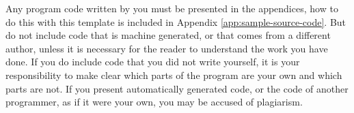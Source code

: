\documentclass[a4paper, notitlepage, 11pt]{article}
\begin{document}
Any program code written by you must be presented in the appendices, how to do this with this template is included in Appendix \ref{app:sample-source-code}. But do not include code that is machine generated, or that comes from a different author, unless it is necessary for the reader to understand the work you have done. If you do include code that you did not write yourself, it is your responsibility to make clear which parts of the program are your own and which  parts  are  not.  If  you  present  automatically  generated  code,  or  the  code  of  another programmer, as if it were your own, you may be accused of plagiarism. 








\clearpage
\appendix 
{}


\clearpage


\clearpage

\end{document}
